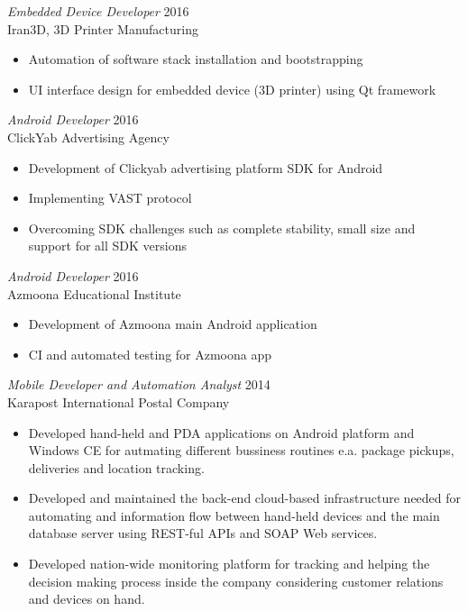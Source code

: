 \documentclass[margin, 10pt]{res} %
\begin{document}
\begin{resume}
{\sl Embedded Device Developer} \hfill 2016 \\
Iran3D, 3D Printer Manufacturing \\

\begin{itemize} \itemsep -2pt %
\item Automation of software stack installation and bootstrapping 
\item UI interface design for embedded device (3D printer) using Qt framework
\end{itemize}

{\sl Android Developer} \hfill 2016 \\
ClickYab Advertising Agency

\begin{itemize} \itemsep -2pt %
\item Development of Clickyab advertising platform SDK for Android
\item Implementing VAST protocol
\item Overcoming SDK challenges such as complete stability, small size and support
  for all SDK versions
\end{itemize}

{\sl Android Developer} \hfill 2016 \\
Azmoona Educational Institute

\begin{itemize} \itemsep -2pt %
\item Development of Azmoona main Android application
\item CI and automated testing for Azmoona app
\end{itemize}

{\sl Mobile Developer and Automation Analyst} \hfill 2014 \\
Karapost International Postal Company

\begin{itemize} \itemsep -2pt %
\item Developed hand-held and PDA applications on Android platform and Windows CE for autmating different bussiness
  routines e.a. package pickups, deliveries and location tracking.
\item Developed and maintained the back-end cloud-based infrastructure needed for automating and information flow between
  hand-held devices and the main database server using REST-ful APIs and SOAP Web services.
\item Developed nation-wide monitoring platform for tracking and helping the
  decision making process inside the company considering customer relations and devices on hand.
\end{itemize}
 

\end{resume}
\end{document}
